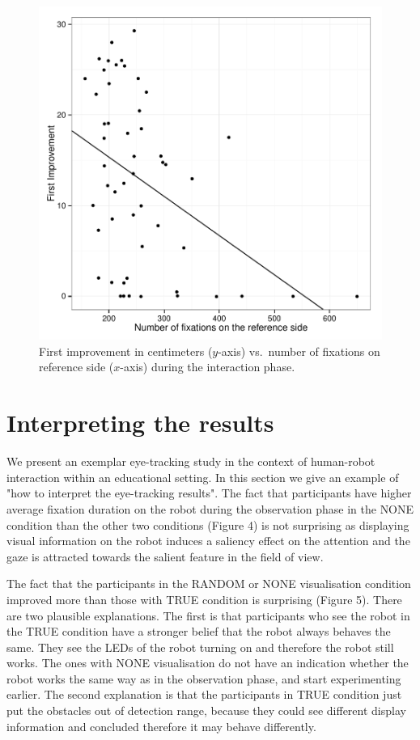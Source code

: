 \documentclass{sig-alternate}
\begin{document}
\begin{figure}[h!]
    \centering
    \includegraphics[width=0.8\linewidth]{corPlotFirstImprove}
    \caption{First improvement in centimeters ($y$-axis) vs.~number of fixations
    on reference side ($x$-axis) during the interaction phase.}
    \label{res4}
\end{figure}


\section{Interpreting the results}

We present an exemplar eye-tracking study in the context of human-robot
interaction within an educational setting. In this section we give an example of "how to interpret the eye-tracking results". The fact that participants have higher average fixation duration on the robot during the observation phase in the {\sf NONE} condition than the other two conditions (Figure 4) is not surprising as displaying visual information on the robot induces a saliency effect on the attention and the gaze is attracted towards the salient feature in the field of view. 

The fact that the participants in the {\sf RANDOM} or {\sf NONE} visualisation condition improved more than those with {\sf TRUE} condition is surprising (Figure 5). There are two plausible explanations. The first is that participants who see the robot in the {\sf TRUE} condition have a stronger belief that the robot always behaves the same. They see the LEDs of the robot turning on and therefore the robot still works. The ones with {\sf NONE} visualisation do not have an indication whether the robot works the same way as in the observation phase, and start experimenting earlier. The second explanation is that the participants in {\sf TRUE} condition just put the obstacles out of detection range, because they could see different display information and concluded therefore it may behave differently.
\end{document}
